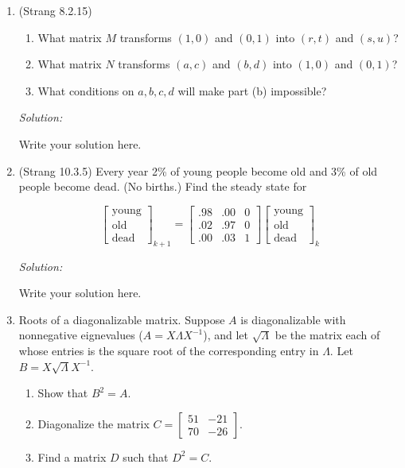 \documentclass[11pt]{article}
\newenvironment{sol}
    {\emph{Solution:}
    }
\newcommand{\headings}{
\large{\textbf{YOUR NAME GOES HERE \hfill 21-241 Fall 2019}\\
\textbf{Homework 9 \hfill Due Friday, November 1}}\\
\rule[0.1in]{\textwidth}{0.01in}
}
\begin{document}
\headings



\begin{enumerate}
\section*{Required Problems}
\item (Strang 8.2.15) 
\begin{enumerate}
\item  What matrix $M$ transforms $(1,0)$ and $(0,1)$ into $(r,t)$ and $(s,u)$?
\item What matrix $N$ transforms $(a,c)$ and $(b,d)$ into $(1,0)$ and $(0,1)$?
\item What conditions on $a, b, c, d$ will make part (b) impossible? 
\end{enumerate}


 \begin{sol}
Write your solution here.
\end{sol}
\clearpage


\item (Strang 10.3.5) Every year 2\% of young people become old and 3\% of old people become dead. (No births.) Find the steady state for 

\[ \begin{bmatrix} \text{young} \\ \text{old} \\ \text{dead} \end{bmatrix}_{k+1} = 
\begin{bmatrix} .98 & .00 & 0 \\ .02 & .97 & 0 \\ .00 & .03 & 1\end{bmatrix}
\begin{bmatrix} \text{young} \\ \text{old} \\ \text{dead} \end{bmatrix}_{k} \]


 \begin{sol}
Write your solution here.
\end{sol}
\clearpage


\item Roots of a diagonalizable matrix.  Suppose $A$ is diagonalizable with nonnegative eignevalues ($A = X \Lambda X^{-1}$), and let $\sqrt{\Lambda}$ be the matrix each of whose entries is the square root of the corresponding entry in $\Lambda$.  Let $B = X \sqrt{\Lambda}X^{-1}$.
\begin{enumerate}
\item Show that $B^2 = A$.
\item Diagonalize the matrix $C = \begin{bmatrix} 51  & -21 \\ 70 &  -26 \end{bmatrix}$.
\item Find a matrix $D$ such that $D^2 = C$.
\end{enumerate}



\end{enumerate}
\end{document}
